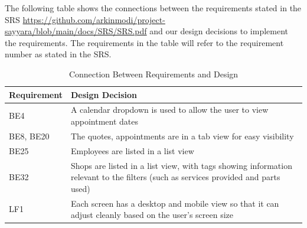 \documentclass[12pt, titlepage]{article}
\begin{document}

The following table shows the connections between the requirements stated in the SRS
\url{https://github.com/arkinmodi/project-sayyara/blob/main/docs/SRS/SRS.pdf} and our design
decisions to implement the requirements. The requirements in the table will refer to the
requirement number as stated in the SRS.

\begin{table}[H]
	\centering
	\caption{Connection Between Requirements and Design}
	\vspace{5pt}
	\begin{tabular}{|p{}|p{}|}
		\hline
		\textbf{Requirement} & \textbf{Design Decision}                                                                                                                                                                                                    \\
		\hline
		BE4                  & A calendar dropdown is used to allow the user to view appointment dates                                                                                                                                                     \\
		\hline
		BE8, BE20            & The quotes, appointments are in a tab view for easy visibility                                                                                                                                                              \\
		\hline
		BE25                 & Employees are listed in a list view                                                                                                                                                                                         \\
		\hline
		BE32                 & Shops are listed in a list view, with tags showing information relevant to the filters (such as services provided and parts used)                                                                                           \\
		\hline
		LF1                  & Each screen has a desktop and mobile view so that it can adjust cleanly based on the user's screen size                                                                                                                     \\

\end{tabular}
\end{table}
\end{document}
